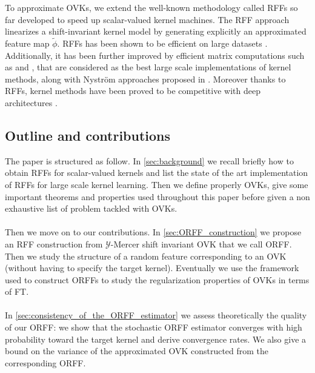\documentclass[twoside,11pt]{article}
\begin{document}
 To approximate OVKs, we extend the well-known methodology called \acfp{RFF}
\citep{Rahimi2007, Le2013, Yang2015, sriper2015, Bach2015, sutherland2015,
rudi2016generalization} so far developed to speed up scalar-valued kernel
machines. The \acs{RFF} approach linearizes a shift-invariant kernel model by
generating explicitly an approximated feature map $\tilde{\phi}$. \acsp{RFF}
has been shown to be efficient on large datasets \citep{rudi2016generalization}.
Additionally, it has been further improved by efficient matrix computations such as
\citep[``FastFood'']{Le2013} and \citep[``SORF'']{felix2016orthogonal}, that
are considered as the best large scale implementations of kernel methods, along
with Nystr\"om approaches proposed in \citet{drineas2005nystrom}. Moreover
thanks to \acsp{RFF}, kernel methods have been proved to be competitive with
deep architectures \citep{lu2014scale, dai2014scalable, yang2015deep}.






\subsection{Outline and contributions}
The paper is structured as follow. In \cref{sec:background} we recall briefly
how to obtain \acp{RFF} for scalar-valued kernels and list the state of the
art implementation of \acp{RFF} for large scale kernel learning. Then we define
properly \aclp{OVK}, give some important theorems and properties used
throughout this paper before given a non exhaustive list of problem tackled
with \acsp{OVK}.
\paragraph{}
Then we move on to our contributions. In \cref{sec:ORFF_construction} we
propose an \acs{RFF} construction from $\mathcal{Y}$-Mercer shift invariant
\acs{OVK} that we call \acf{ORFF}. Then we study the structure of a random
feature corresponding to an \acs{OVK} (without having to specify the target
kernel). Eventually we use the framework used to construct \acsp{ORFF} to study 
the regularization properties of \acsp{OVK} in terms of \acl{FT}.
\paragraph{}
In \cref{sec:consistency_of_the_ORFF_estimator} we assess theoretically the
quality of our \acs{ORFF}: we show that the stochastic \acs{ORFF} estimator
converges with high probability toward the target kernel and derive convergence
rates. We also give a bound on the variance of the approximated \acs{OVK}
constructed from the corresponding \acs{ORFF}.
\end{document}
